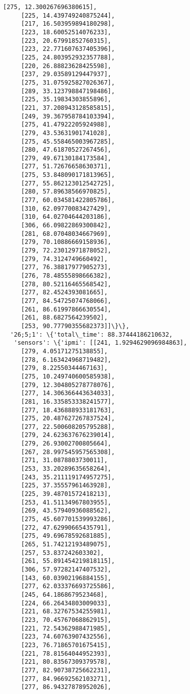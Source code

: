 \documentclass[11pt]{article}
\begin{document}
\begin{tcolorbox}[breakable, size=fbox, boxrule=.5pt, pad at break*=1mm, opacityfill=0]
\begin{Verbatim}[commandchars=\\\{\}]
     [275, 12.300267696380615],
     [225, 14.439749240875244],
     [217, 16.503959894180298],
     [223, 18.60052514076233],
     [223, 20.67991852760315],
     [223, 22.771607637405396],
     [225, 24.803952932357788],
     [220, 26.88823628425598],
     [237, 29.03589129447937],
     [275, 31.075925827026367],
     [289, 33.123798847198486],
     [225, 35.19834303855896],
     [221, 37.208943128585815],
     [249, 39.367958784103394],
     [275, 41.47922205924988],
     [279, 43.53631901741028],
     [275, 45.558465003967285],
     [280, 47.61870527267456],
     [279, 49.67130184173584],
     [277, 51.72676658630371],
     [275, 53.848090171813965],
     [277, 55.862123012542725],
     [280, 57.89638566970825],
     [277, 60.034581422805786],
     [310, 62.09770083427429],
     [310, 64.02704644203186],
     [306, 66.09822869300842],
     [281, 68.07048034667969],
     [279, 70.10886669158936],
     [279, 72.23012971878052],
     [279, 74.3124749660492],
     [277, 76.38817977905273],
     [276, 78.48555898666382],
     [278, 80.52116465568542],
     [277, 82.4524393081665],
     [277, 84.54725074768066],
     [261, 86.61997866630554],
     [261, 88.6827564239502],
     [253, 90.77790355682373]]\}\},
  '26;5;1': \{'total\_time': 88.37444186210632,
   'sensors': \{'ipmi': [[241, 1.9294629096984863],
     [279, 4.05171275138855],
     [278, 6.163424968719482],
     [279, 8.22550344467163],
     [275, 10.249740600585938],
     [279, 12.304805278778076],
     [277, 14.306366443634033],
     [281, 16.335853338241577],
     [277, 18.436888933181763],
     [275, 20.487627267837524],
     [277, 22.500608205795288],
     [279, 24.623637676239014],
     [279, 26.93002700805664],
     [267, 28.997545957565308],
     [271, 31.0878803730011],
     [253, 33.20289635658264],
     [243, 35.211119174957275],
     [225, 37.35557961463928],
     [225, 39.48701572418213],
     [253, 41.51134967803955],
     [269, 43.57940936088562],
     [275, 45.607701539993286],
     [272, 47.62990665435791],
     [275, 49.69678592681885],
     [265, 51.74212193489075],
     [257, 53.837242603302],
     [261, 55.891454219818115],
     [306, 57.97282147407532],
     [143, 60.03902196884155],
     [277, 62.033376693725586],
     [245, 64.1868679523468],
     [224, 66.26434803009033],
     [221, 68.32767534255981],
     [223, 70.45767068862915],
     [221, 72.54362988471985],
     [223, 74.60763907432556],
     [223, 76.71865701675415],
     [221, 78.81564044952393],
     [221, 80.83567309379578],
     [277, 82.90738725662231],
     [277, 84.96692562103271],
     [277, 86.94327878952026],

\end{Verbatim}
\end{tcolorbox}
\end{document}
